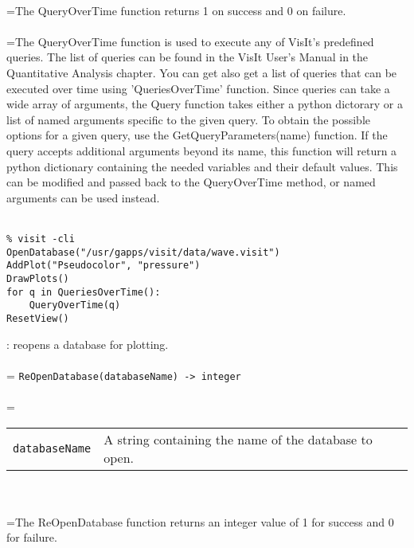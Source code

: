 \documentclass[10pt,a4paper]{report}
\begin{document}
 \\ 
\hangindent=\parindent The QueryOverTime function returns 1 on success and 0 on failure. \\[-3mm] 

 \\ 
\hangindent=\parindent The QueryOverTime function is used to execute any of VisIt's predefined queries. The list of queries can be found in the VisIt User's Manual in the Quantitative Analysis chapter. You can get also get a list of queries that can be executed over time using 'QueriesOverTime' function. Since queries can take a wide array of arguments, the Query function takes  either a python dictorary or a list of named arguments specific to the  given query.  To obtain the possible options for a given query, use the  GetQueryParameters(name) function.  If the query accepts additional  arguments beyond its name, this function will return a python dictionary containing the needed variables and their default values.  This can be modified and passed back to the QueryOverTime method, or named arguments  can be used instead. \\[-3mm] 

\\[-6mm]
\begin{verbatim}% visit -cli
OpenDatabase("/usr/gapps/visit/data/wave.visit")
AddPlot("Pseudocolor", "pressure")
DrawPlots()
for q in QueriesOverTime():
    QueryOverTime(q)
ResetView()
\end{verbatim}
\newpage


{}
: reopens a database for plotting.\\[-3mm]

 \\ 
\hangindent=\parindent 
\verb!ReOpenDatabase(databaseName) -> integer!\\ [-3mm]

 \\ 
\hangindent=\parindent 
\begin{tabular}{lp{9cm}}
\verb!databaseName! & A string containing the name of the database to open. \\
\end{tabular} \\[-2mm]


 \\ 
\hangindent=\parindent The ReOpenDatabase function returns an integer value of 1 for success and 0 for failure. \\[-3mm] 
\end{document}
